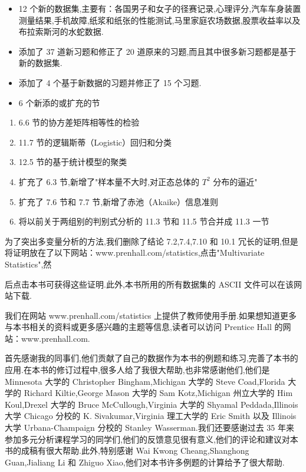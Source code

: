 \begin{itemize}[leftmargin=1.6em,itemsep=1pt,topsep=2pt]
\item 12 个新的数据集,主要有：各国男子和女子的径赛记录,心理评分,汽车车身装置测量结果,手机故障,纸浆和纸张的性能测试,马里家庭农场数据,股票收益率以及布拉索斯河的水蛇数据.
\item 添加了 37 道新习题和修正了 20 道原来的习题,而且其中很多新习题都是基于新的数据集.
\item 添加了 4 个基于新数据的习题并修正了 15 个习题.
\item 6 个新添的或扩充的节
\end{itemize}

\begin{enumerate}[label=\arabic*.,leftmargin=2.6em,itemsep=1pt,topsep=2pt]
\item 6.6 节的协方差矩阵相等性的检验
\item 11.7 节的逻辑斯蒂（Logistic）回归和分类
\item 12.5 节的基于统计模型的聚类
\item 扩充了 6.3 节,新增了"样本量不大时,对正态总体的 $T^2$ 分布的逼近"
\item 扩充了 7.6 节和 7.7 节,新增了赤池（Akaike）信息准则
\item 将以前关于两组别的判别式分析的 11.3 节和 11.5 节合并成 11.3 一节
\end{enumerate}

\quad 为了突出多变量分析的方法,我们删除了结论 7.2,7.4,7.10 和 10.1 冗长的证明,但是将证明放在了以下网站：www.prenhall.com/statistics,点击"Multivariate Statistics",然

\clearpage
\noindent 后点击本书可获得这些证明.此外,本书所用的所有数据集的 ASCII 文件可以在该网站下载.

\quad 我们在网站 www.prenhall.com/statistics 上提供了教师使用手册.如果想知道更多与本书相关的资料或更多感兴趣的主题等信息,读者可以访问 Prentice Hall 的网站：www.prenhall.com.


\noindent 首先感谢我的同事们,他们贡献了自己的数据作为本书的例题和练习,完善了本书的应用.在本书的修订过程中,很多人给了我很大帮助,也非常感谢他们,他们是 Minnesota 大学的 Christopher Bingham,Michigan 大学的 Steve Coad,Florida 大学的 Richard Kiltie,George Mason 大学的 Sam Kotz,Michigan 州立大学的 Him Koul,Drexel 大学的 Bruce McCullough,Virginia 大学的 Shyamal Peddada,Illinois 大学 Chicago 分校的 K. Sivakumar,Virginia 理工大学的 Eric Smith 以及 Illinois 大学 Urbana-Champaign 分校的 Stanley Wasserman.我们还要感谢过去 35 年来参加多元分析课程学习的同学们,他们的反馈意见很有意义,他们的评论和建议对本书的成稿有很大帮助.此外,特别感谢 Wai Kwong Cheang,Shanghong Guan,Jialiang Li 和 Zhiguo Xiao,他们对本书许多例题的计算给予了很大帮助.

